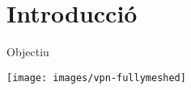 \section{Introducció}
    \begin{frame}{Objectiu}
        \begin{center}
        \texttt{[image: images/vpn-fullymeshed]}
        \end{center}
    \end{frame}
